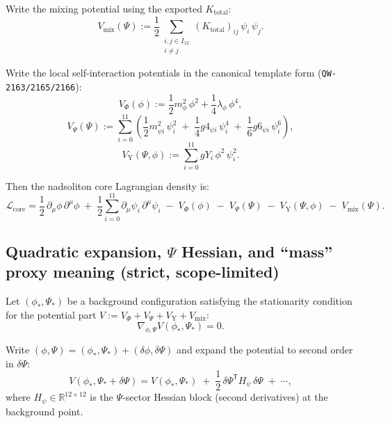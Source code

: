 \documentclass[11pt,a4paper]{article}
\begin{document}
Write the mixing potential using the exported $K_{\mathrm{total}}$:
\[
V_{\mathrm{mix}}(\Psi)
:=
\frac12 \sum_{\substack{i,j\in I_{12}\\ i\neq j}} (K_{\mathrm{total}})_{ij}\,\psi_i\,\psi_j.
\]

Write the local self-interaction potentials in the canonical template form (\texttt{QW-2163/2165/2166}):
\[
V_{\Phi}(\phi)
:=
\frac12 m_{\phi}^2\,\phi^2 + \frac14 \lambda_{\phi}\,\phi^4,
\]
\[
V_{\Psi}(\Psi)
:=
\sum_{i=0}^{11}\left(
\frac12 m_{\psi i}^2\,\psi_i^2
\;+\;\frac14 g4_{\psi i}\,\psi_i^4
\;+\;\frac16 g6_{\psi i}\,\psi_i^6
\right),
\]
\[
V_{\mathrm{Y}}(\Psi,\phi)
:=
\sum_{i=0}^{11} gY_i\,\phi^2\,\psi_i^2.
\]

Then the nadsoliton core Lagrangian density is:
\[
\mathcal{L}_{\mathrm{core}}
=
\frac12\,\partial_\mu \phi\,\partial^\mu \phi
\;+\;\frac12\sum_{i=0}^{11}\partial_\mu \psi_i\,\partial^\mu \psi_i
\;-\;V_{\Phi}(\phi)
\;-\;V_{\Psi}(\Psi)
\;-\;V_{\mathrm{Y}}(\Psi,\phi)
\;-\;V_{\mathrm{mix}}(\Psi).
\]

\subsection{Quadratic expansion, $\Psi$ Hessian, and “mass” proxy meaning (strict, scope-limited)}

Let $(\phi_\ast,\Psi_\ast)$ be a background configuration satisfying the stationarity condition for the potential part
$V:=V_{\Phi}+V_{\Psi}+V_{\mathrm{Y}}+V_{\mathrm{mix}}$:
\[
\nabla_{\phi,\Psi} V(\phi_\ast,\Psi_\ast)=0.
\]

Write $(\phi,\Psi)=(\phi_\ast,\Psi_\ast)+(\delta\phi,\delta\Psi)$ and expand the potential to second order in $\delta\Psi$:
\[
V(\phi_\ast,\Psi_\ast+\delta\Psi)
=
V(\phi_\ast,\Psi_\ast)
\;+\;\frac12\,\delta\Psi^{\mathsf T} H_{\psi}\,\delta\Psi
\;+\;\cdots,
\]
where $H_{\psi}\in\mathbb{R}^{12\times 12}$ is the $\Psi$-sector Hessian block (second derivatives) at the background point.
\end{document}
